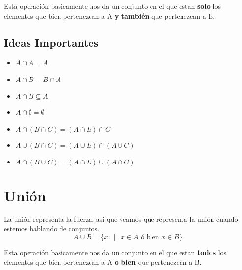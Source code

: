 \documentclass[12pt, fleqn]{report}                             %
\DeclareMathOperator \Space     {\quad}                         %
\DeclareMathOperator \MiniSpace {\;}                            %
\newcommand \Such           {\MiniSpace | \MiniSpace}           %
\theoremstyle{break}                                            %
\begin{document}
            Esta operación basicamente nos da un conjunto en el que estan \textbf{solo} los elementos
            que bien pertenezcan a A \textbf{y también} que pertenezcan a B.

            \subsection{Ideas Importantes}

                \begin{itemize}
                    \item $A \cap A = A$

                    \item $A \cap B = B \cap A$

                    \item $A \cap B \subseteq A$

                    \item $A \cap \emptyset = \emptyset$

                    \item $A \cap (B \cap C) = (A \cap B) \cap C$

                    \item $A \cup (B \cap C) = (A \cup B) \cap (A \cup C)$

                    \item $A \cap (B \cup C) = (A \cap B) \cup (A \cap C)$
                \end{itemize}


        \clearpage
        \section{Unión}

            La unión representa la fuerza, así que veamos que representa la unión cuando estemos
            hablando de conjuntos.
            \begin{equation*}
                A \cup B = \{ x \Such x \in A \text{ ó bien } x \in B \}
            \end{equation*}

            Esta operación basicamente nos da un conjunto en el que estan \textbf{todos} los elementos
            que bien pertenezcan a A \textbf{o bien} que pertenezcan a B.
\end{document}
